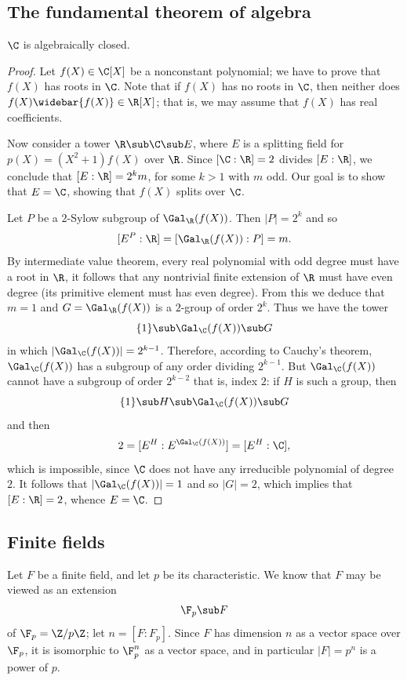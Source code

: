 \subsection{The fundamental theorem of algebra}
\begin{theorem}
$\C$ is algebraically closed.
\end{theorem}
\begin{proof}
Let $f(X)\in\C[X]$ be a nonconstant polynomial; we have to prove that $f(X)$ has roots in $\C$. Note that if $f(X)$ has no roots in $\C$, then neither does $f(X)\widebar{f(X)}\in\R[X]$; that is, we may assume that $f(X)$ has real coefficients.\par
Now consider a tower $\R\sub\C\sub E$, where $E$ is a splitting field for $p(X)=(X^2+1)f(X)$ over $\R$. Since $[\C:\R]=2$ divides $[E:\R]$, we conclude that $[E:\R]=2^km$, for some $k>1$ with $m$ odd. Our goal is to show that $E=\C$, showing that $f(X)$ splits over $\C$.\par
Let $P$ be a $2$-Sylow subgroup of $\Gal_\R(f(X))$. Then $|P|=2^k$ and so
\[[E^P:\R]=[\Gal_\R(f(X)):P]=m.\]
By intermediate value theorem, every real polynomial with odd degree must have a root in $\R$, it follows that any nontrivial finite extension of $\R$ must have even degree (its primitive element must has even degree). From this we deduce that $m=1$ and $G=\Gal_\R(f(X))$ is a $2$-group of order $2^k$. Thus we have the tower
\[\{1\}\sub\Gal_\C(f(X))\sub G\]
in which $|\Gal_\C(f(X))|=2^{k-1}$. Therefore, according to Cauchy's theorem, $\Gal_\C(f(X))$ has a subgroup of any order dividing $2^{k-1}$. But $\Gal_\C(f(X))$ cannot have a subgroup of order $2^{k-2}$ that is, index $2$: if $H$ is such a group, then
\[\{1\}\sub H\sub\Gal_\C(f(X))\sub G\]
and then
\[2=[E^H:E^{\Gal_\C(f(X))}]=[E^H:\C],\]
which is impossible, since $\C$ does not have any irreducible polynomial of degree $2$. It follows that $|\Gal_\C(f(X))|=1$ and so $|G|=2$, which implies that $[E:\R]=2$, whence $E=\C$. 
\end{proof}
\subsection{Finite fields}
Let $F$ be a finite field, and let $p$ be its characteristic. We know that $F$ may be viewed as an extension
\[\F_p\sub F\]
of $\F_p=\Z/p\Z$; let $n=[F:F_p]$. Since $F$ has dimension $n$ as a vector space over $\F_p$, it is isomorphic to $\F_p^n$ as a vector space, and in particular $|F|=p^n$ is a power of $p$.
